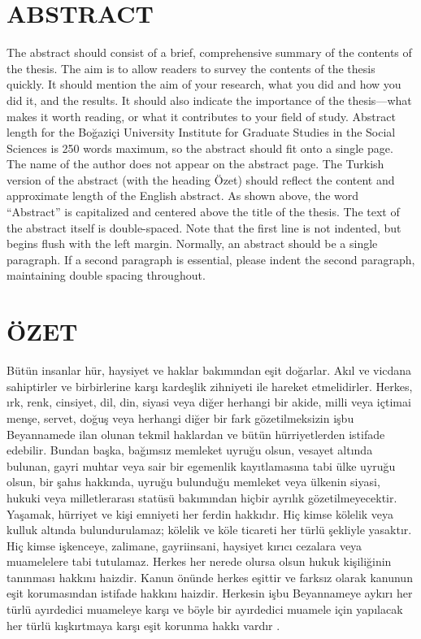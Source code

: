 \chapter*{ABSTRACT\\ \ttitle}
\setcounter{page}{4}

The abstract should consist of a brief, comprehensive summary of the contents of
the thesis. The aim is to allow readers to survey the contents of the thesis
quickly. It should mention the aim of your research, what you did and how you
did it, and the results. It should also indicate the importance of the thesis—what
makes it worth reading, or what it contributes to your field of study. Abstract
length for the Boğaziçi University Institute for Graduate Studies in the Social
Sciences is 250 words maximum, so the abstract should fit onto a single page.
The name of the author does not appear on the abstract page. The Turkish
version of the abstract (with the heading Özet) should reflect the content and
approximate length of the English abstract. As shown above, the word “Abstract”
is capitalized and centered above the title of the thesis. The text of the abstract
itself is double-spaced. Note that the first line is not indented, but begins flush
with the left margin. Normally, an abstract should be a single paragraph. If a
second paragraph is essential, please indent the second paragraph, maintaining
double spacing throughout. 


\newpage

\chapter*{ÖZET\\ \ttitletr}

Bütün insanlar hür, haysiyet ve haklar bakımından eşit doğarlar. Akıl ve vicdana sahiptirler ve birbirlerine karşı kardeşlik zihniyeti ile hareket etmelidirler. Herkes, ırk, renk, cinsiyet, dil, din, siyasi veya diğer herhangi bir akide, milli veya içtimai menşe, servet, doğuş veya herhangi diğer bir fark gözetilmeksizin işbu Beyannamede ilan olunan tekmil haklardan ve bütün hürriyetlerden istifade edebilir. Bundan başka, bağımsız memleket uyruğu olsun, vesayet altında bulunan, gayri muhtar veya sair bir egemenlik kayıtlamasına tabi ülke uyruğu olsun, bir şahıs hakkında, uyruğu bulunduğu memleket veya ülkenin siyasi, hukuki veya milletlerarası statüsü bakımından hiçbir ayrılık gözetilmeyecektir. Yaşamak, hürriyet ve kişi emniyeti her ferdin hakkıdır. Hiç kimse kölelik veya kulluk altında bulundurulamaz; kölelik ve köle ticareti her türlü şekliyle yasaktır. Hiç kimse işkenceye, zalimane, gayriinsani, haysiyet kırıcı cezalara veya muamelelere tabi tutulamaz. Herkes her nerede olursa olsun hukuk kişiliğinin tanınması hakkını haizdir. Kanun önünde herkes eşittir ve farksız olarak kanunun eşit korumasından istifade hakkını haizdir. Herkesin işbu Beyannameye aykırı her türlü ayırdedici muameleye karşı ve böyle bir ayırdedici muamele için yapılacak her türlü kışkırtmaya karşı eşit korunma hakkı vardır \citep{assembly1948universal}. 
